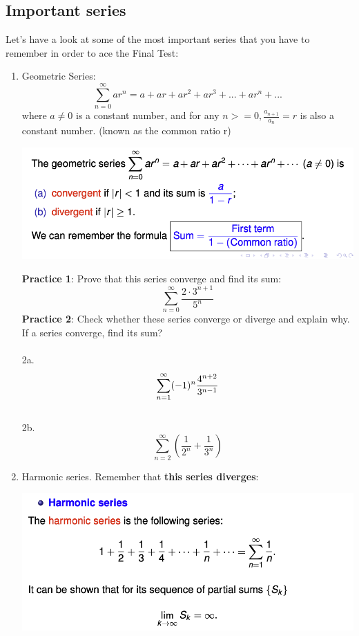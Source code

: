 \documentclass{article}
\begin{document}
\subsection{Important series}
Let's have a look at some of the most important series that you have to remember in order to ace the Final Test: 
\begin{enumerate}
    \item Geometric Series:
    $$\sum_{n=0}^{\infty} ar^n = a + ar + ar^2 + ar^3 + ... + ar^n + ...$$
    where $a \neq 0 $ is a constant number, and for any $n>= 0, \frac{a_{n+1}}{a_n} = r$ is also a constant number. (known as the common ratio r)
    \begin{center}
        \includegraphics[scale = 0.7]{Screenshot 2023-12-07 at 12.36.24 PM.png}
    \end{center}
    \textbf{Practice 1}: Prove that this series converge and find its sum:
    $$\sum_{n=0}^{\infty} \frac{2 \cdot 3^{n+1}}{5^n}$$ 
    \textbf{Practice 2}: Check whether these series converge or diverge and explain why. If a series converge, find its sum? \\
        \\2a.
        $$\sum_{n=1}^{\infty} (-1)^n \frac{4^{n+2}}{3^{n-1}} \\$$
        \\2b.
        $$\sum_{n=2}^{\infty} \left(\frac{1}{2^n} + \frac{1}{3^n} \right) $$
    \item Harmonic series. Remember that \textbf{this series diverges}:
    \begin{center}
        \includegraphics[scale = 0.7]{Screenshot 2023-12-07 at 12.49.12 PM.png}
    \end{center}


\end{enumerate}
\end{document}
